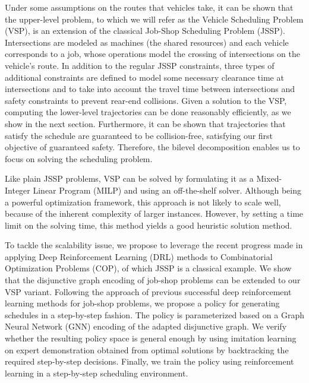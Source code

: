 \documentclass{article}
\theoremstyle{definition}
\theoremstyle{plain}
\begin{document}
Under some assumptions on the routes that vehicles take, it can be shown that
the upper-level problem, to which we will refer as the Vehicle Scheduling
Problem (VSP), is an extension of the classical Job-Shop Scheduling Problem
(JSSP). Intersections are modeled as machines (the shared resources) and each
vehicle corresponds to a job, whose operations model the crossing of
intersections on the vehicle's route.
%
In addition to the regular JSSP constraints, three types of additional
constraints are defined to model some necessary clearance time at intersections
and to take into account the travel time between intersections and safety
constraints to prevent rear-end collisions.
Given a solution to the VSP, computing the lower-level trajectories can be done
reasonably efficiently, as we show in the next section. Furthermore, it can be
shown that trajectories that satisfy the schedule are guaranteed to
be collision-free, satisfying our first objective of guaranteed safety.
Therefore, the bilevel decomposition enables us to focus on solving the
scheduling problem.

Like plain JSSP problems, VSP can be solved by formulating it as a Mixed-Integer
Linear Program (MILP) and using an off-the-shelf solver. Although being a
powerful optimization framework, this approach is not likely to scale well,
because of the inherent complexity of larger instances. However, by setting a
time limit on the solving time, this method yields a good heuristic solution
method.

To tackle the scalability issue, we propose to leverage the recent progress made
in applying Deep Reinforcement Learning (DRL) methods to Combinatorial
Optimization Problems (COP), of which JSSP is a classical example. We show that
the disjunctive graph encoding of job-shop problems can be extended to our VSP
variant. Following the approach of previous successful deep reinforcement
learning methods for job-shop problems, we propose a policy for generating
schedules in a step-by-step fashion. The policy is parameterized based on a
Graph Neural Network (GNN) encoding of the adapted disjunctive graph. We verify
whether the resulting policy space is general enough by using imitation learning
on expert demonstration obtained from optimal solutions by backtracking the
required step-by-step decisions. Finally, we train the policy using
reinforcement learning in a step-by-step scheduling environment.
\end{document}
